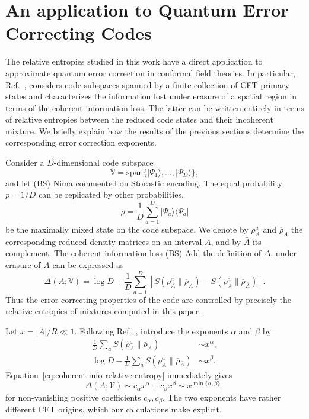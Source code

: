 \documentclass[11pt]{article}
\newcommand{\BS}[1]{{\color{BSorange}\footnotesize{(BS) #1}}}
\begin{document}
\section{An application to Quantum Error Correcting Codes}
\label{sec:QEC}

The relative entropies studied in this work have a direct application to
approximate quantum error correction in conformal field theories.  In
particular, Ref.~\cite{song2026approximatequantumerrorcorrection}, considers code subspaces spanned by a finite collection of CFT primary states and characterizes the information lost under erasure of a spatial region in terms of the coherent-information loss.  The latter can be written entirely in terms of relative entropies between the reduced code states and their incoherent mixture.  We briefly explain how the results of the previous sections determine the corresponding error correction exponents.

Consider a $D$-dimensional code subspace
\begin{equation}
    \mathbb{V} =\mathrm{span}\{
    |\Psi_1\rangle,\ldots,|\Psi_D\rangle\},
\end{equation}
and let \BS{Nima commented on Stocastic encoding. The equal probability $p= 1/D$ can be replicated by other probabilities.}
\begin{equation}
    \overline\rho
    =\frac1D\sum_{a=1}^{D}|\Psi_a\rangle\langle\Psi_a|
\end{equation}
be the maximally mixed state on the code subspace.  We denote by $\rho^a_A$ and $\overline\rho_A$ the corresponding reduced density matrices on an interval $A$, and by $\bar A$ its complement.  The coherent-information loss
\BS{Add the definition of $\Delta$.}
under erasure of $A$ can be expressed as~\cite{song2026approximatequantumerrorcorrection}
\begin{equation}
\label{eq:coherent-info-relative-entropy}
    \Delta(A; \mathbb{V} )
    =
    \log D
    +\frac1D\sum_{a=1}^{D}
    \left[
    S(\rho^a_A\|\overline\rho_A)
    -
    S(\rho^a_{\bar A}\|\overline\rho_{\bar A})
    \right].
\end{equation}
Thus the error-correcting properties of the code are controlled by precisely the relative entropies of mixtures computed in this paper.

Let $x=|A|/R\ll1$.  Following Ref.~\cite{song2026approximatequantumerrorcorrection}, introduce the exponents
$\alpha$ and $\beta$ by
\begin{align}
 \frac1D\sum_a S(\rho^a_A\|\overline\rho_A)
     &\sim x^\alpha ,
 \label{eq:alpha-def}\\
 \log D-\frac1D\sum_a
 S(\rho^a_{\bar A}\|\overline\rho_{\bar A})
     &\sim x^\beta .
 \label{eq:beta-def}
\end{align}
Equation~\eqref{eq:coherent-info-relative-entropy} immediately gives
\begin{equation}
    \Delta(A;\mathcal V)
    \sim c_\alpha x^\alpha+c_\beta x^\beta
    \sim x^{\min\{\alpha,\beta\}},
\label{eq:QEC-loss}
\end{equation}
for non-vanishing positive coefficients $c_\alpha,c_\beta$. The two exponents have rather different CFT origins, which our calculations make explicit.
\end{document}

